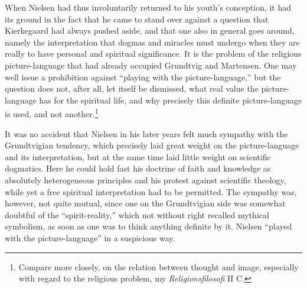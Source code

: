 \documentclass[12pt,a4paper]{book}
\newcommand{\opage}[1]{\marginnote{\footnotesize\textit{[#1]}}}
\begin{document}
When Nielsen had thus involuntarily returned to his youth's conception, it had its ground in the
fact that he came to \opage{194}stand over against a question that Kierkegaard had always pushed aside, and
that one also in general goes around, namely the interpretation that dogmas and miracles must
undergo when they are really to have personal and spiritual significance. It is the problem of
the religious picture-language that had already occupied Grundtvig and Martensen. One may well
issue a prohibition against ``playing with the picture-language,'' but the question does not,
after all, let itself be dismissed, what real value the picture-language has for the spiritual
life, and why precisely this definite picture-language is used, and not another.\footnote{Compare
more closely, on the relation between thought and image, especially with regard to the religious
problem, my \emph{Religionsfilosofi} II C.}

It was no accident that Nielsen in his later years felt much sympathy with the Grundtvigian
tendency, which precisely laid great weight on the picture-language and its interpretation, but
at the same time laid little weight on scientific dogmatics. Here he could hold fast his doctrine
of faith and knowledge as absolutely heterogeneous principles and his protest against scientific
theology, while yet a free spiritual interpretation had to be permitted. The sympathy was,
however, not quite mutual, since one on the Grundtvigian side was somewhat doubtful of the
``spirit-reality,'' which not without right recalled mythical symbolism, as soon as one was to
think anything definite by it. Nielsen ``played with the picture-language'' in a suspicious way.
\end{document}

